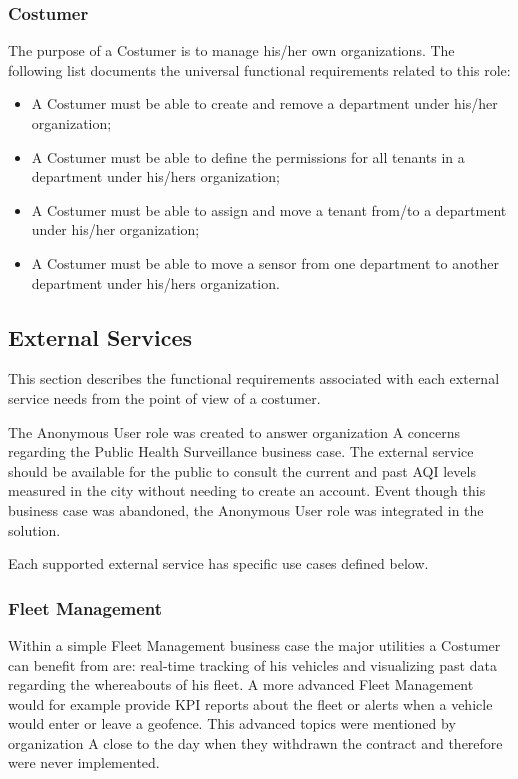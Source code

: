 \subsubsection{Costumer}
\label{subsubsec:requirements:functional:sensae:costumer}

The purpose of a Costumer is to manage his/her own organizations.
The following list documents the universal functional requirements related to this role:

\begin{itemize}
    \item A Costumer must be able to create and remove a department under his/her organization;
    \item A Costumer must be able to define the permissions for all tenants in a department under his/hers organization;
    \item A Costumer must be able to assign and move a tenant from/to a department under his/her organization;
    \item A Costumer must be able to move a sensor from one department to another department under his/hers organization.
\end{itemize}

\subsection{External Services}
\label{subsec:requirements:functional:services}

This section describes the functional requirements associated with each external service needs from the point of view of a costumer.

The Anonymous User role was created to answer organization A concerns regarding the Public Health Surveillance business case. The external service should be available for the public to consult the current and past \gls{AQI} levels measured in the city without needing to create an account. Event though this business case was abandoned, the Anonymous User role was integrated in the solution.

Each supported external service has specific use cases defined below.

\subsubsection{Fleet Management}
\label{subsubsec:requirements:functional:services:fleet}

Within a simple Fleet Management business case the major utilities a Costumer can benefit from are: real-time tracking of his vehicles and visualizing past data regarding the whereabouts of his fleet. A more advanced Fleet Management would for example provide \gls{KPI} reports about the fleet or alerts when a vehicle would enter or leave a geofence. This advanced topics were mentioned by organization A close to the day when they withdrawn the contract and therefore were never implemented.

